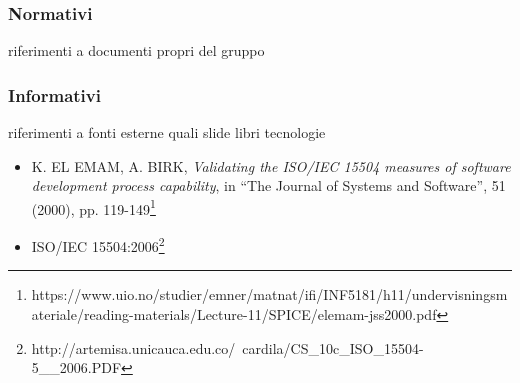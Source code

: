 \subsubsection{Normativi}
riferimenti a documenti propri del gruppo
\subsubsection{Informativi}
riferimenti a fonti esterne quali slide libri tecnologie
\begin{itemize}
	\item K. EL EMAM, A. BIRK, \textit{Validating the ISO/IEC 15504 measures of software development process capability}, in \enquote{The Journal of Systems and Software}, 51 (2000), pp. 119-149\footnote{https://www.uio.no/studier/emner/matnat/ifi/INF5181/h11/undervisningsmateriale/reading-materials/Lecture-11/SPICE/elemam-jss2000.pdf}
	\item ISO/IEC 15504:2006\footnote{http://artemisa.unicauca.edu.co/~cardila/CS\_10c\_ISO\_15504-5\_\_2006.PDF}
\end{itemize} 
